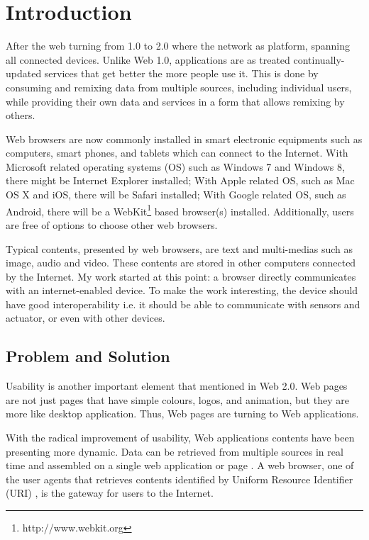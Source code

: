\chapter{Introduction}
\label{chapter:intro}
After the web turning from 1.0 to 2.0 where the network as platform, spanning all connected devices. Unlike Web 1.0, applications are as treated continually-updated services that get better the more people use it. This is done by consuming and remixing data from multiple sources, including individual users, while providing their own data and services in a form that allows remixing by others. \cite{o2005web} 

Web browsers are now commonly installed in smart electronic equipments such as computers, smart phones, and tablets which can connect to the Internet. With Microsoft related operating systems (OS) such as Windows 7 and Windows 8, there might be Internet Explorer installed; With Apple related OS, such as Mac OS X and iOS, there will be Safari installed; With Google related OS, such as Android, there will be a WebKit\footnote{http://www.webkit.org} based browser(s) installed. Additionally, users are free of options to choose other web browsers. 

Typical contents, presented by web browsers, are text and multi-medias such as image, audio and video. These contents are stored in other computers connected by the Internet. My work started at this point: a browser directly communicates with an internet-enabled device. To make the work interesting, the device should have good interoperability i.e. it should be able to communicate with sensors and actuator, or even with other devices.

\section{Problem and Solution}

Usability is another important element that mentioned in Web 2.0. Web pages are not just pages that have simple colours, logos, and animation, but they are more like desktop application. Thus, Web pages are turning to Web applications. \cite{Lewis:2006:WEB:1217666.1217669}

With the radical improvement of usability, Web applications contents have been presenting more dynamic. Data can be retrieved from multiple sources in real time and assembled on a single web application or page \cite{Lewis:2006:WEB:1217666.1217669}. A web browser, one of the user agents that retrieves contents identified by Uniform Resource Identifier (URI) \cite{ArchitectWorldWideWebVolumeOne}, is the gateway for users to the Internet.

